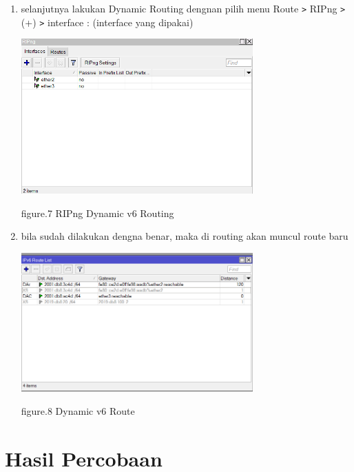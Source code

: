 \begin{enumerate}
\begin{enumerate}
        \item selanjutnya lakukan Dynamic Routing dengnan pilih menu Route \texttt{\text>} RIPng \texttt{\text>} (+) \texttt{\text>} interface : (interface yang dipakai)
        
        \begin{center}
            \includegraphics[width=0.7\textwidth]{image/P5/dynamic/dynamic-ripng.png}    
            
            figure.7 RIPng Dynamic v6 Routing
        \end{center}

        \item bila sudah dilakukan dengna benar, maka di routing akan muncul route baru 
        
        \begin{center}
            \includegraphics[width=0.7\textwidth]{image/P5/dynamic/dynamic-routing.png}    
            
            figure.8 Dynamic v6 Route
        \end{center}

    \end{enumerate}
    
\end{enumerate}

\section{Hasil Percobaan}

